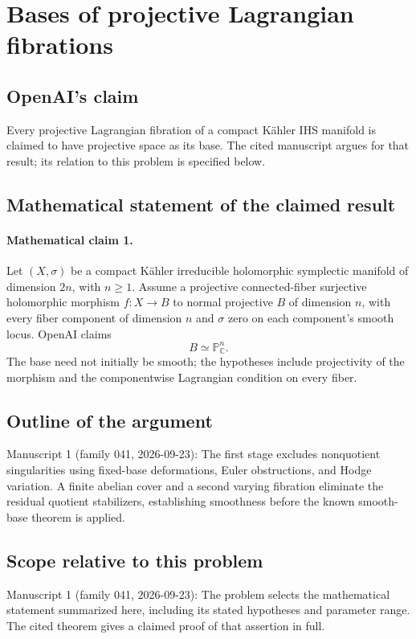 \documentclass[11pt]{article}
\begin{document}
\section*{Bases of projective Lagrangian fibrations}

\subsection{OpenAI's claim}
Every projective Lagrangian fibration of a compact Kähler IHS manifold is claimed to have projective space as its base. The cited manuscript argues for that result; its relation to this problem is specified below.

\subsection{Mathematical statement of the claimed result}
\paragraph{Mathematical claim 1.} Let $(X,\sigma)$ be a compact Kähler irreducible holomorphic symplectic manifold of dimension $2n$, with $n\ge1$. Assume a projective connected-fiber surjective holomorphic morphism $f:X\to B$ to normal projective $B$ of dimension $n$, with every fiber component of dimension $n$ and $\sigma$ zero on each component's smooth locus. OpenAI claims
\[
B\simeq\mathbb P^n_{\mathbb C}.
\]
The base need not initially be smooth; the hypotheses include projectivity of the morphism and the componentwise Lagrangian condition on every fiber.

\subsection{Outline of the argument}
Manuscript 1 (family 041, 2026-09-23): The first stage excludes nonquotient singularities using fixed-base deformations, Euler obstructions, and Hodge variation. A finite abelian cover and a second varying fibration eliminate the residual quotient stabilizers, establishing smoothness before the known smooth-base theorem is applied.

\subsection{Scope relative to this problem}
Manuscript 1 (family 041, 2026-09-23): The problem selects the mathematical statement summarized here, including its stated hypotheses and parameter range. The cited theorem gives a claimed proof of that assertion in full.
\end{document}

